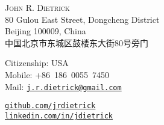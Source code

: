 \documentclass[10pt]{article}
\makeatletter
\def\spaceBetweenSections{\vspace{-10pt}}
\def\fullName{John R. Dietrick}
\def\englishAddressLineOne{80 Gulou East Street, Dongcheng District}
\def\englishAddressLineTwo{Beijing 100009, China}
\def\chineseAddress{中国北京市东城区鼓楼东大街80号旁门}
\def\citizenship{USA}
\def\mobileNumber{+86~186~0055~7450}
\def\emailAddress{j.r.dietrick@gmail.com}
\makeatother
\begin{document}
\begin{CJK}{UTF8}{gbsn}

\vspace{0pt}
\begin{center}
    \flushleft
    \begin{minipage}[b]{0.42\linewidth}
        \vspace{0pt}
        {\huge\textsc{\fullName}}\\
        \englishAddressLineOne\\
        \englishAddressLineTwo
        \ifx\USAVERSION\undefined
            \\\chineseAddress
        \fi
    \end{minipage}
    \begin{minipage}[b]{0.32\linewidth}
        \vspace{0pt}
        Citizenship: \citizenship\\
        Mobile: \mobileNumber\\
        Mail: \texttt{\small\href{mailto:\emailAddress}{\emailAddress}}
    \end{minipage}
    \begin{minipage}[b]{0.24\linewidth}
        \vspace{0pt}
        \texttt{\small\href{https://github.com/jrdietrick}{github.com/jrdietrick}}\\
        \texttt{\small\href{https://linkedin.com/in/jdietrick}{linkedin.com/in/jdietrick}}
    \end{minipage}
\end{center}

\spaceBetweenSections


\end{CJK}
\end{document}
